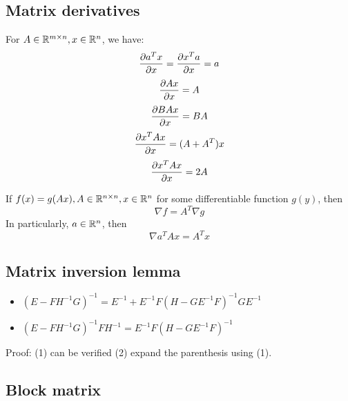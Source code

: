 \begin{refsection}
\subsection{Matrix derivatives}


\begin{mdframed}
For $A\in \mathbb{R}^{m\times n},x\in \mathbb{R}^n$, we have:
$$\frac{\partial a^Tx}{\partial x} = \frac{\partial x^Ta}{\partial x} = a$$
$$\frac{\partial Ax}{\partial x} = A $$
$$\frac{\partial BAx}{\partial x} = BA $$
$$\frac{\partial x^TAx}{\partial x} = (A+A^T)x $$
$$\frac{\partial x^TAx}{\partial x} = 2A $$
\end{mdframed}

\begin{lemma}
	If $f(x) = g(Ax), A\in \mathbb{R}^{n\times n},x\in \mathbb{R}^n$ for some differentiable function $g(y)$, then 
	$$\nabla f = A^T \nabla g$$
	In particularly, $a\in \mathbb{R}^n$, then
	$$\nabla a^TAx = A^Tx $$
	
\end{lemma}


\subsection{Matrix inversion lemma}

\begin{lemma}
\cite[120]{murphy2012machine}
\begin{itemize}
    \item $(E-FH^{-1}G)^{-1} = E^{-1} + E^{-1}F(H-GE^{-1}F)^{-1}GE^{-1}$
    \item $(E-FH^{-1}G)^{-1}FH^{-1} = E^{-1}F(H-GE^{-1}F)^{-1}$
\end{itemize}
\end{lemma}
Proof: (1) can be verified (2) expand the parenthesis using (1).



\subsection{Block matrix}


\end{refsection}
